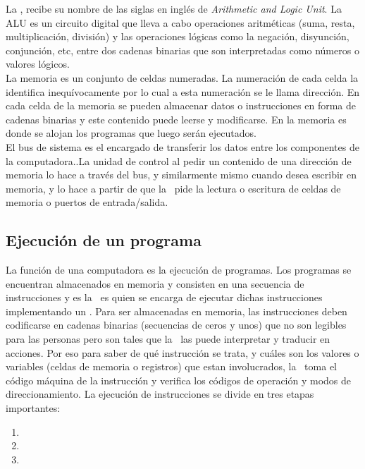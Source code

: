 La \ALU, recibe su nombre de las siglas en inglés de \textit{Arithmetic and Logic Unit}. La ALU es un circuito digital que lleva a cabo operaciones aritméticas (suma, resta, multiplicación, división) y las operaciones lógicas como la negación, disyunción, conjunción, etc, entre dos cadenas binarias que son interpretadas como números o valores lógicos.\\

La memoria es un conjunto de celdas numeradas. La numeración de cada celda la identifica inequívocamente por lo cual a esta numeración se le llama dirección. En cada celda de la memoria se pueden almacenar datos o instrucciones en forma de cadenas binarias y este contenido puede leerse y modificarse. En la memoria es donde se alojan los programas que luego serán ejecutados.\\

El bus de sistema es el encargado de transferir los datos entre los componentes de la computadora..La unidad de control al pedir un contenido de una dirección de memoria lo hace a través del bus, y similarmente mismo cuando desea escribir en memoria, y lo hace a partir de que la \UC\ pide la lectura o escritura de celdas de memoria o puertos de entrada/salida.

\subsection{Ejecución de un programa}

La función de una computadora es la ejecución de programas. Los programas se encuentran almacenados en memoria y consisten en una secuencia de instrucciones y es la \UC\ es quien se encarga de ejecutar dichas instrucciones implementando un \textbf{\ciclo}. Para ser almacenadas en memoria, las instrucciones deben codificarse en cadenas binarias (secuencias de ceros y unos) que no son legibles para las personas pero son tales que la \UC\ las puede interpretar y traducir en acciones. Por eso para saber de qué instrucción se trata, y cuáles son los valores o variables (celdas de memoria o registros) que estan involucrados, la \UC\ toma el código máquina de la instrucción y verifica los códigos de operación y modos de direccionamiento. La ejecución de instrucciones se divide en tres etapas importantes: 

\begin{enumerate}
\item \BI
\item \DI
\item \EI
\end{enumerate}


